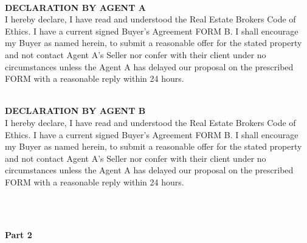 \documentclass{article}
\begin{document}
\begin{Form}
    \begin{minipage}[t]{0.49\linewidth}
        \begin{tcolorbox}[colback=white,colframe=primary,title=Party A - THE AGENT/BROKER (SELLER'S AGENT) ]
            \\
            \uppercase{\textbf{Declaration by agent A}}\\
            I hereby declare, I have read and understood the Real Estate Brokers Code of Ethics. I have a current
            signed Buyer's Agreement FORM B. I shall encourage my Buyer as named herein, to submit a reasonable
            offer for the stated property and not contact Agent A's Seller nor confer with their client under no
            circumstances unless the Agent A has delayed our proposal on the prescribed FORM with a reasonable
            reply within 24 hours.
        \end{tcolorbox}
    \end{minipage}%
    \hfill
    \begin{minipage}[t]{0.49\linewidth}
        \begin{tcolorbox}[colback=white,colframe=primary,title=Party B - THE AGENT/BROKER (BUYER'S AGENT)]
            \\
            \uppercase{\textbf{Declaration by agent B}}\\
            I hereby declare, I have read and understood the Real Estate Brokers Code of Ethics. I have a current
            signed Buyer's Agreement FORM B. I shall encourage my Buyer as named herein, to submit a reasonable
            offer for the stated property and not contact Agent A's Seller nor confer with their client under no
            circumstances unless the Agent A has delayed our proposal on the prescribed FORM with a reasonable
            reply within 24 hours.
        \end{tcolorbox}
    \end{minipage}
    \\\\
    \begin{minipage}[t]{0.49\linewidth}
        \begin{minipage}[t]{1.0\linewidth}
            \textbf{Part 2}
        \end{minipage}
        \begin{tcolorbox}[colback=white,colframe=white,title=Property Details,coltitle=black]
             \\

\end{tcolorbox}
\end{minipage}
\end{Form}
\end{document}
